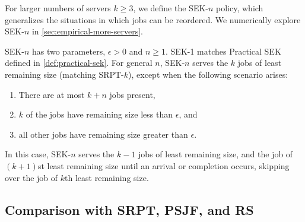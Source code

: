 \documentclass[acmsmall]{acmart}
\begin{document}
For larger numbers of servers $k \ge 3$, we define the SEK-$n$ policy, which generalizes the situations in which jobs can be reordered.
We numerically explore SEK-$n$ in \cref{sec:empirical-more-servers}.
\begin{definition}\label{def:sek-n}
    SEK-$n$ has two parameters, $\epsilon > 0$ and $n \ge 1$. SEK-1 matches Practical SEK defined in \cref{def:practical-sek}.
    For general $n$, SEK-$n$ serves the $k$ jobs of least remaining size (matching SRPT-$k$), except when the following scenario arises:
    \begin{enumerate}
        \item There are at most $k+n$ jobs present,
        \item $k$ of the jobs have remaining size less than $\epsilon$, and
        \item all other jobs have remaining size greater than $\epsilon$.
    \end{enumerate}
    In this case, SEK-$n$ serves the $k-1$ jobs of least remaining size, and the job of $(k+1)$st least remaining size
    until an arrival or completion occurs, skipping over the job of $k$th least remaining size.
\end{definition}

\subsection{Comparison with SRPT, PSJF, and RS}
\label{sec:empirical-old-policies}
\end{document}
